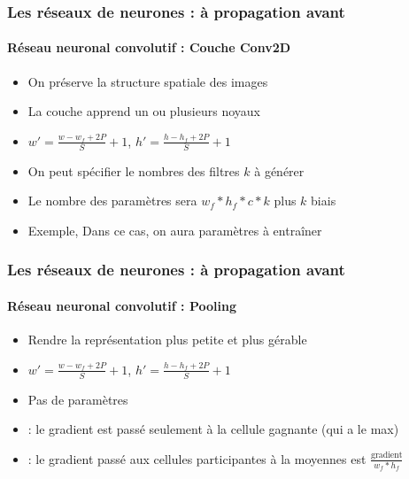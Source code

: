 \documentclass[xcolor=table]{beamer}
\begin{document}
\begin{frame}
\frametitle{Les réseaux de neurones : à propagation avant}
\framesubtitle{Réseau neuronal convolutif : Couche Conv2D}

\begin{minipage}{0.60\textwidth} 
	\begin{itemize}
		\item On préserve la structure spatiale des images
		\item La couche apprend un ou plusieurs noyaux
		\item $ w' = \frac{w - w_f + 2P}{S} + 1$,  $ h' = \frac{h - h_f + 2P}{S} + 1$
		\item On peut spécifier le nombres des filtres $k$ à générer 
		\item Le nombre des paramètres sera $w_f * h_f * c * k$ plus $k$ biais
		\item Exemple,  Dans ce cas, on aura  paramètres à entraîner
	\end{itemize}
\end{minipage}
%
\begin{minipage}{0.39\textwidth}
	
\end{minipage}

\end{frame}

\begin{frame}
\frametitle{Les réseaux de neurones : à propagation avant}
\framesubtitle{Réseau neuronal convolutif : Pooling}

\begin{minipage}{0.60\textwidth} 
	\begin{itemize}
		\item Rendre la représentation plus petite et plus gérable
		\item $ w' = \frac{w - w_f + 2P}{S} + 1$,  $ h' = \frac{h - h_f + 2P}{S} + 1$
		\item Pas de paramètres 
		\item {} : le gradient est passé seulement à la cellule gagnante (qui a le max) 
		\item {} : le gradient passé aux cellules participantes à la moyennes est $\frac{\text{gradient}}{w_f * h_f}$ 
	\end{itemize}
\end{minipage}
%
\begin{minipage}{0.39\textwidth}
	
\end{minipage}

\end{frame}
\end{document}
